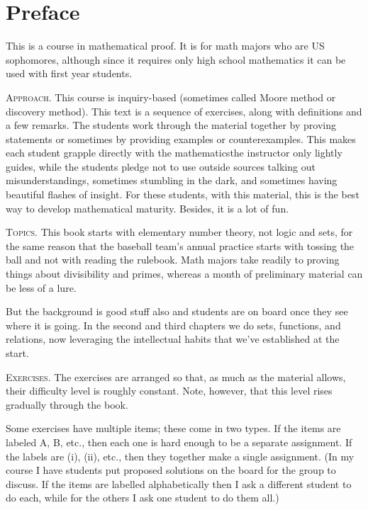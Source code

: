 \chapter*{Preface}

This is a course in mathematical proof. 
It is for math majors who are US sophomores, although since
it requires only high school mathematics
it can be used with first year students.



\medskip
\noindent\textsc{Approach.}
This course is inquiry-based (sometimes called Moore method 
or discovery method).
This text is a sequence of exercises,
along with definitions and a few remarks.
The students work through the material together by
proving statements or sometimes by providing examples or counterexamples.
This makes each student grapple directly with the 
mathematics\Dash the instructor only 
lightly guides, while the students pledge not to use outside sources\Dash
talking out misunderstandings, 
sometimes stumbling in the dark, and sometimes
having beautiful flashes of insight.
For these students, with this material,
this is the best way to develop mathematical maturity.
Besides, it is a lot of fun.


\medskip
\noindent\textsc{Topics.}
This book starts with elementary number theory, not logic and sets, 
for the same reason
that the baseball team's annual practice starts with tossing the ball and 
not with reading the rulebook.
Math majors take readily to proving things about
divisibility and primes, 
whereas a month of preliminary material can be less of a lure.

But the background is good stuff also and 
students are on board once they see where it is going.
In the second and third chapters we do
sets, functions, and relations, now leveraging the
intellectual habits that we've established at the start.



\medskip
\noindent\textsc{Exercises.}
The exercises are arranged so that, as much as the material allows,
their difficulty level is roughly constant.
Note, however, that this level rises gradually  
through the book.

Some exercises have multiple items; these come in two types.
If the items are labeled \textsc{A}, \textsc{B}, etc., 
then each one is hard enough to be a separate assignment.
If the labels are (i), (ii), etc., then they together make
a single assignment.
(In my course I have students put proposed solutions on the board
for the group to discuss.
If the items are labelled alphabetically then I ask a different student
to do each, while for the others I ask one student to do them all.)



